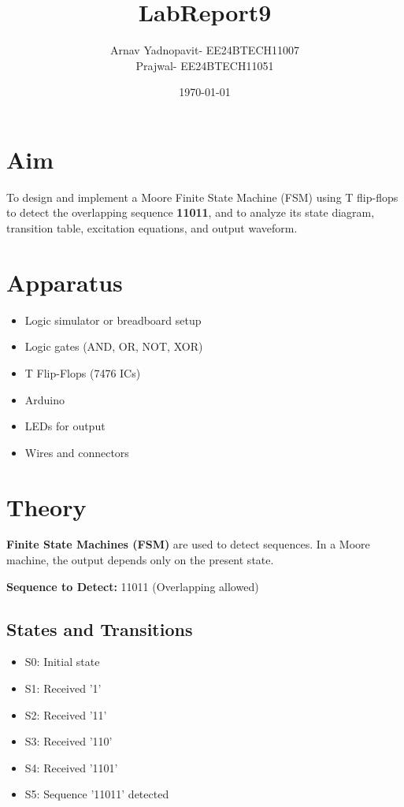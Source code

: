 \documentclass[12pt]{article}
\title{LabReport9}
\author{Arnav Yadnopavit- EE24BTECH11007\\Prajwal- EE24BTECH11051}
\date{\today}
\begin{document}
\maketitle

\section*{Aim}
To design and implement a Moore Finite State Machine (FSM) using T flip-flops to detect the overlapping sequence \textbf{11011}, and to analyze its state diagram, transition table, excitation equations, and output waveform.

\section*{Apparatus}
\begin{itemize}
    \item Logic simulator or breadboard setup
    \item Logic gates (AND, OR, NOT, XOR)
    \item T Flip-Flops (7476 ICs)
    \item Arduino
    \item LEDs for output
    \item Wires and connectors
\end{itemize}

\section*{Theory}
\textbf{Finite State Machines (FSM)} are used to detect sequences. In a Moore machine, the output depends only on the present state.

\textbf{Sequence to Detect:} 11011 (Overlapping allowed)

\subsection*{States and Transitions}
\begin{itemize}
    \item S0: Initial state
    \item S1: Received '1'
    \item S2: Received '11'
    \item S3: Received '110'
    \item S4: Received '1101'
    \item S5: Sequence '11011' detected
\end{itemize}
\end{document}

